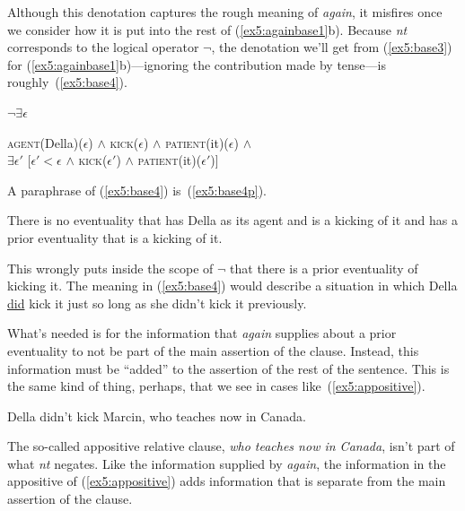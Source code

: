Although this denotation captures the rough meaning of \emph{again}, it misfires once we consider how it is put into the rest of (\ref{ex5:againbase1}b). Because \emph{nt} corresponds to the logical operator $\neg$, the denotation we'll get from (\ref{ex5:base3}) for (\ref{ex5:againbase1}b)---ignoring the contribution made by tense---is roughly~(\ref{ex5:base4}).
\begin{exe}
	\raggedright
	\ex \label{ex5:base4} 
	$\neg \exists \epsilon$ \parbox[t]{3in}{\textsc{agent}(Della)($\epsilon$) $\wedge$ \textsc{kick}($\epsilon$) $\wedge$ \textsc{patient}(it)($\epsilon$) $\wedge$\\
	$\exists \epsilon '$ [$\epsilon ' < \epsilon$ $\wedge$ \textsc{kick}($\epsilon '$) $\wedge$ \textsc{patient}(it)($\epsilon '$)]}
\end{exe}
A paraphrase of (\ref{ex5:base4}) is~(\ref{ex5:base4p}).
\begin{exe}
	\raggedright
	\ex \label{ex5:base4p} 
	There is no eventuality that has Della as its agent and is a kicking of it and has a prior eventuality that is a kicking of it.
\end{exe}
This wrongly puts inside the scope of $\neg$ that there is a prior eventuality of kicking it. The meaning in (\ref{ex5:base4}) would describe a situation in which Della \underline{did} kick it just so long as she didn't kick it previously.

What's needed is for the information that \emph{again} supplies about a prior eventuality to not be part of the main assertion of the clause. Instead, this information must be ``added'' to the assertion of the rest of the sentence. This is the same kind of thing, perhaps, that we see in cases like~(\ref{ex5:appositive}).%
%
%
%
\begin{exe}
	\raggedright
	\ex \label{ex5:appositive} 
	Della didn't kick Marcin, who teaches now in Canada.
\end{exe}
The so-called appositive relative clause, \emph{who teaches now in Canada}, isn't part of what \emph{nt} negates. Like the information supplied by \emph{again}, the information in the appositive of (\ref{ex5:appositive}) adds information that is separate from the main assertion of the clause. 

